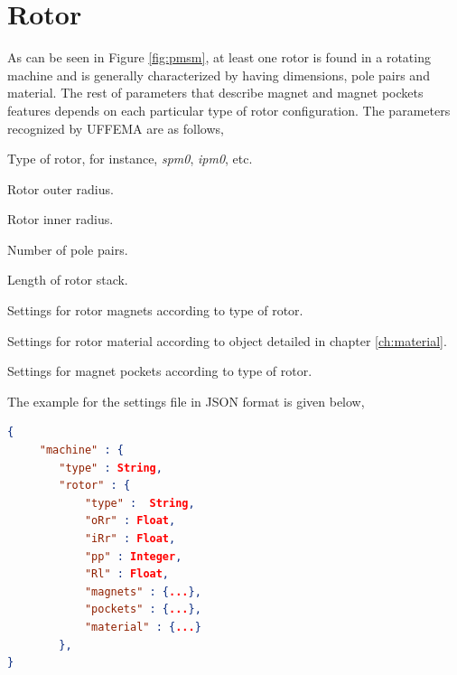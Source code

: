 \documentclass[justified]{tufte-book} %
\begin{document}
\section{Rotor}
\begin{fullwidth}
As can be seen in Figure \ref{fig:pmsm}, at least one rotor is found in a rotating machine and is generally  characterized by having dimensions, pole pairs and material. The rest of parameters that describe magnet and magnet pockets features depends on each particular type of rotor configuration. The parameters recognized by UFFEMA are as follows,
\end{fullwidth}
\begin{description}[leftmargin=4cm, style=nextline]
\item[\normalfont{\ttfamily{\textbf{type}}: \textit{String}}] Type of rotor, for instance, \textit{spm0}, \textit{ipm0}, etc.
\item[\normalfont{\ttfamily{\textbf{oRr}}: \textit{Float}}] Rotor outer radius.
\item[\normalfont{\ttfamily{\textbf{iRr}}: \textit{Float}}] Rotor inner radius.
\item[\normalfont{\ttfamily{\textbf{pp}}: \textit{Integer}}] Number of pole pairs.
\item[\normalfont{\ttfamily{\textbf{Rl}}: \textit{Float}}] Length of rotor stack.
\item[\normalfont{\ttfamily{\textbf{magnets}}: \textit{Object}}] Settings for rotor magnets according to type of rotor.
\item[\normalfont{\ttfamily{\textbf{material}}: \textit{Object}}] Settings for rotor material according to object detailed in chapter \ref{ch:material}.
\item[\normalfont{\ttfamily{\textbf{pockets}}: \textit{Object}}] Settings for magnet pockets according to type of rotor.
\end{description}



The example for the settings file in JSON format is given below,

\begin{lstlisting}[language=json]
{
	 "machine" : {
    	"type" : String,
    	"rotor" : {
      		"type" :  String,
     		"oRr" : Float,
      		"iRr" : Float,
      		"pp" : Integer,
      		"Rl" : Float,
      		"magnets" : {...},
      		"pockets" : {...},
      		"material" : {...}
		},
}
\end{lstlisting}
\end{document}
